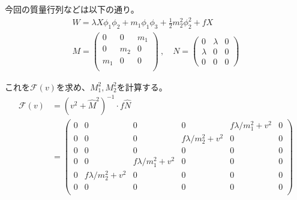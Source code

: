 \documentclass[
  unicode,a4paper,9pt,
  xcolor = {dvipsnames,svgnames},
  hyperref ={colorlinks=true,citecolor=Navy,linkcolor=NavyBlue,urlcolor=purple},
  ja=standard,lualatex
]{beamer}
\begin{document}
\begin{frame}

  今回の質量行列などは以下の通り。
  \begin{gather}
    W=\lambda X\phi_{1}\phi_{2}+m_{1}\phi_{1}\phi_{3}+\frac{1}{2}m_{2}^2\phi_{2}^2+fX
    \tag*{\clubsuit}
    \label{eqn:eg}
    \\
    M
    =
    \begin{pmatrix}
      0     & 0     & m_{1} \\
      0     & m_{2} & 0     \\
      m_{1} & 0     & 0     \\
    \end{pmatrix}
    \ ,\quad
    N
    =
    \begin{pmatrix}
      0       & \lambda & 0 \\
      \lambda & 0       & 0 \\
      0       & 0       & 0
    \end{pmatrix}
    \nonumber
  \end{gather}

  これを$\mathcal{F}(v)$を求め、$M_{1}^2, M_{2}^2$を計算する。
  \begin{align}
    \mathcal{F}(v)
     & =
    \left( v^2+\hat{M}^2 \right)^{-1}
    \cdot
    f\hat{N}
    \nonumber
    \\
     & =
    \begin{pmatrix}
      0 & 0                     & 0                     & 0                     & f\lambda /m_{1}^2+v^2 & 0 \\
      0 & 0                     & 0                     & f\lambda /m_{2}^2+v^2 & 0                     & 0 \\
      0 & 0                     & 0                     & 0                     & 0                     & 0 \\
      0 & 0                     & f\lambda /m_{1}^2+v^2 & 0                     & 0                     & 0 \\
      0 & f\lambda /m_{2}^2+v^2 & 0                     & 0                     & 0                     & 0 \\
      0 & 0                     & 0                     & 0                     & 0                     & 0 \\
    \end{pmatrix}
    \nonumber
  \end{align}

\end{frame}
\end{document}
